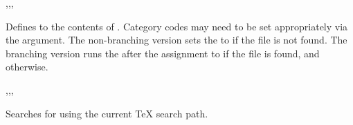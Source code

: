 \documentclass[oneside]{book}
\begin{document}
\begin{function}{\fileGet,\fileGetT,\fileGetF,\fileGetTF}
\begin{syntax}
   
    
    
     
\end{syntax}
Defines  to the contents of .
Category codes may need to be set appropriately via the 
argument.
The non-branching version sets the  to  if the file is
not found. The branching version runs the  after the
assignment to  if the file is found, and 
otherwise.
\end{function}

\begin{function}{\fileIfExist,\fileIfExistT,\fileIfExistF,\fileIfExistTF}
\begin{syntax}
 
  
  
   
\end{syntax}
Searches for  using the current \TeX{} search path.
\end{function}

\end{document}
